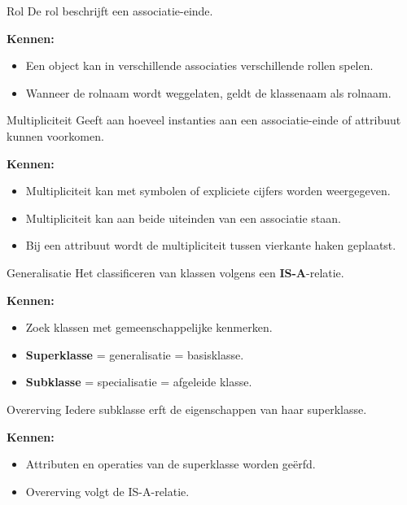 \documentclass[11pt,a4paper]{article}
\begin{document}
\begin{definition}{Rol}
De rol beschrijft een associatie-einde.

\textbf{Kennen:}
\begin{itemize}
    \item Een object kan in verschillende associaties verschillende rollen spelen.
    \item Wanneer de rolnaam wordt weggelaten, geldt de klassenaam als rolnaam.
\end{itemize}
\end{definition}

\begin{definition}{Multipliciteit}
Geeft aan hoeveel instanties aan een associatie-einde of attribuut kunnen voorkomen.

\textbf{Kennen:}
\begin{itemize}
    \item Multipliciteit kan met symbolen of expliciete cijfers worden weergegeven.
    \item Multipliciteit kan aan beide uiteinden van een associatie staan.
    \item Bij een attribuut wordt de multipliciteit tussen vierkante haken geplaatst.
\end{itemize}
\end{definition}

\begin{definition}{Generalisatie}
Het classificeren van klassen volgens een \textbf{IS-A}-relatie.

\textbf{Kennen:}
\begin{itemize}
    \item Zoek klassen met gemeenschappelijke kenmerken.
    \item \textbf{Superklasse} = generalisatie = basisklasse.
    \item \textbf{Subklasse} = specialisatie = afgeleide klasse.
\end{itemize}
\end{definition}

\begin{definition}{Overerving}
Iedere subklasse erft de eigenschappen van haar superklasse.

\textbf{Kennen:}
\begin{itemize}
    \item Attributen en operaties van de superklasse worden geërfd.
    \item Overerving volgt de IS-A-relatie.
\end{itemize}
\end{definition}
\end{document}

